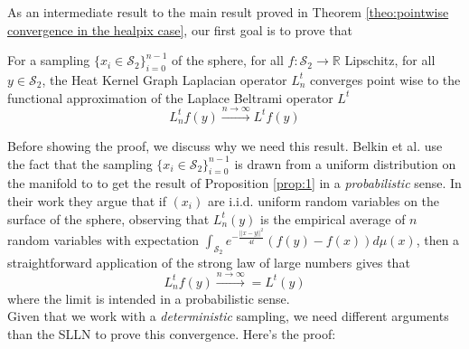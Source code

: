 As an intermediate result to the main result proved in Theorem \ref{theo:pointwise convergence in the healpix case}, our first goal is to prove that 
\begin{prop}\label{prop:1}
	For a sampling $\{x_i\in\mathcal S_2\}_{i=0}^{n-1}$ of the sphere, for all $f: \mathcal S_2 \rightarrow \mathbb R$ Lipschitz, for all $y\in\mathcal S_2$, the Heat Kernel Graph Laplacian operator $L^t_n$ converges point wise to the functional approximation of the Laplace Beltrami operator $L^t$
	$$ L_n^tf(y)\xrightarrow{n\to\infty} L^tf(y)$$
\end{prop} 

Before showing the proof, we discuss why we need this result. Belkin et al. use the fact that the sampling $\{x_i\in\mathcal S_2\}_{i=0}^{n-1}$ is drawn from a uniform distribution on the manifold to to get the result of Proposition \ref{prop:1} in a \textit{probabilistic} sense. In their work they argue that if $(x_i)$ are i.i.d. uniform random variables on the surface of the sphere, observing that $L_n^t(y)$ is the empirical average of $n$ random variables with expectation $\int_{\mathcal S_2} e^{-\frac{||x-y||^2}{4t}}\left(f(y)-f(x)\right)d\mu(x)$, then a straightforward application of the strong law of large numbers gives that $$ L_n^tf(y)\xrightarrow{n\to\infty}  = L^t(y)$$ where the limit is intended in a probabilistic sense.\\

Given that we work with a \textit{deterministic} sampling, we need different arguments than the SLLN to prove this convergence. Here's the proof:

